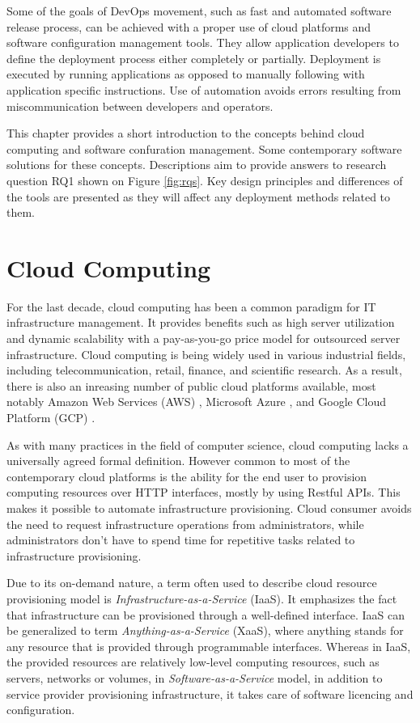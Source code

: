 \documentclass[officiallayout]{tktla}
\begin{document}
Some of the goals of DevOps movement, such as fast and automated software
release process, can be achieved with a proper use of cloud platforms and
software configuration management tools. They allow application developers to
define the deployment process either completely or partially. Deployment is
executed by running applications as opposed to manually following with
application specific instructions. Use of automation avoids errors resulting
from miscommunication between developers and operators.

This chapter provides a short introduction to the concepts behind cloud
computing and software confuration management. Some contemporary software
solutions for these concepts. Descriptions aim to provide answers to research
question RQ1 shown on Figure \ref{fig:rqs}. Key design principles and
differences of the tools are presented as they will affect any deployment
methods related to them.

\section{Cloud Computing}

For the last decade, cloud computing has been a common paradigm for IT
infrastructure management. It provides benefits such as high server utilization
and dynamic scalability with a pay-as-you-go price model for outsourced server
infrastructure. Cloud computing is being widely used in various industrial
fields, including telecommunication, retail, finance, and scientific research.
As a result, there is also an inreasing number of public cloud platforms
available, most notably Amazon Web Services (AWS) \cite{aws}, Microsoft Azure
\cite{azure}, and Google Cloud Platform (GCP) \cite{gcp}.

As with many practices in the field of computer science, cloud computing lacks
a universally agreed formal definition. However common to most of the
contemporary cloud platforms is the ability for the end user to provision
computing resources over HTTP interfaces, mostly by using Restful APIs. This
makes it possible to automate infrastructure provisioning. Cloud consumer
avoids the need to request infrastructure operations from administrators, while
administrators don't have to spend time for repetitive tasks related to
infrastructure provisioning.

Due to its on-demand nature, a term often used to describe cloud resource
provisioning model is \textit{Infrastructure-as-a-Service} (IaaS). It
emphasizes the fact that infrastructure can be provisioned through a
well-defined interface. IaaS can be generalized to term
\textit{Anything-as-a-Service} (XaaS), where anything stands for any resource
that is provided through programmable interfaces. Whereas in IaaS, the provided
resources are relatively low-level computing resources, such as servers,
networks or volumes, in \textit{Software-as-a-Service} model, in addition to
service provider provisioning infrastructure, it takes care of software
licencing and configuration.
\end{document}
